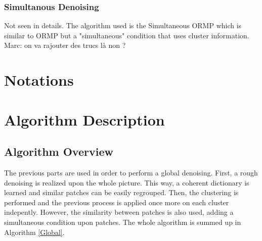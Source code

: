 \documentclass{ipol}
\begin{document}
\subsubsection{Simultanous Denoising}

Not seen in details. The algorithm used is the Simultaneous ORMP which is similar to ORMP but a "simultaneous" condition that uses cluster information.
{\color{red} \\ Marc:  on va rajouter des trucs l\`a non ?}

\newpage

\section{Notations}

\newpage

\section{Algorithm Description}

\subsection{ Algorithm Overview }

The previous parts are used in order to perform a global denoising. First, a rough denoising is realized upon the whole picture. This way, a coherent dictionary is learned and similar patches can be easily regrouped. Then, the clustering is performed and the previous process is applied once more on each cluster indepently. However, the similarity between patches is also used, adding a simultaneous condition upon patches. The whole algorithm is summed up in Algorithm \ref{Global}.\\
\end{document}
